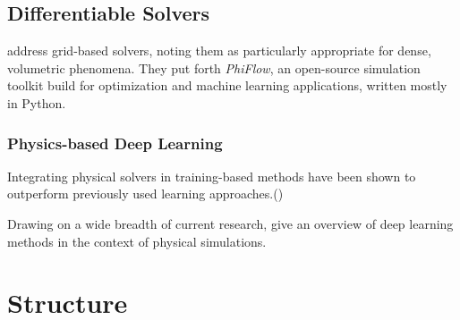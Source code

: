 
\subsection{Differentiable Solvers}
\cite{holl2019pdecontrol} address grid-based solvers, noting them as
particularly appropriate for dense, volumetric phenomena. They put forth
\textit{PhiFlow}, an open-source simulation toolkit build for optimization and
machine learning applications, written mostly in Python.


\subsubsection*{Physics-based Deep Learning}
Integrating physical solvers in training-based methods have been shown to
outperform previously used learning approaches.(\cite{solver-in-the-loop})

Drawing on a wide breadth of current research, \cite{pbdl} give an overview of
deep learning methods in the context of physical simulations. 



\section{Structure}


